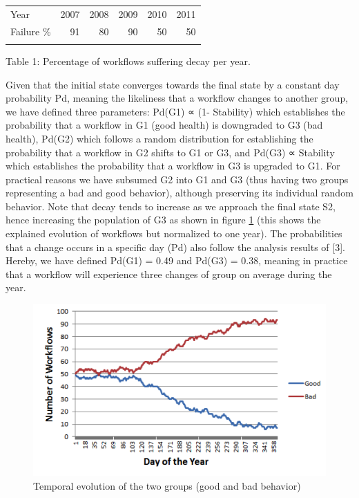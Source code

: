 \begin{longtable}[c]{@{}lrrrrr@{}}
\hline\noalign{\medskip}
Year & 2007 & 2008 & 2009 & 2010 & 2011
\\\noalign{\medskip}
\hline\noalign{\medskip}
Failure \% & 91 & 80 & 90 & 50 & 50
\\\noalign{\medskip}
\hline
\end{longtable}

Table 1: Percentage of workflows suffering decay per year.

Given that the initial state converges towards the final state by a
constant day probability Pd, meaning the likeliness that a workflow
changes to another group, we have defined three parameters: Pd(G1) ∝ (1-
Stability) which establishes the probability that a workflow in G1 (good
health) is downgraded to G3 (bad health), Pd(G2) which follows a random
distribution for establishing the probability that a workflow in G2
shifts to G1 or G3, and Pd(G3) ∝ Stability which establishes the
probability that a workflow in G3 is upgraded to G1. For practical
reasons we have subsumed G2 into G1 and G3 (thus having two groups
representing a bad and good behavior), although preserving its
individual random behavior. Note that decay tends to increase as we
approach the final state S2, hence increasing the population of G3 as
shown in figure \ref{TemporalEvolution} (this shows the explained
evolution of workflows but normalized to one year). The probabilities
that a change occurs in a specific day (Pd) also follow the analysis
results of {[}3{]}. Hereby, we have defined Pd(G1) = 0.49 and Pd(G3) =
0.38, meaning in practice that a workflow will experience three changes
of group on average during the year.

\begin{figure}[htbp]
\centering
\includegraphics{figures/TemporalEvolution.png}
\caption{Temporal evolution of the two groups (good and bad behavior)
\label{TemporalEvolution}}
\end{figure}

